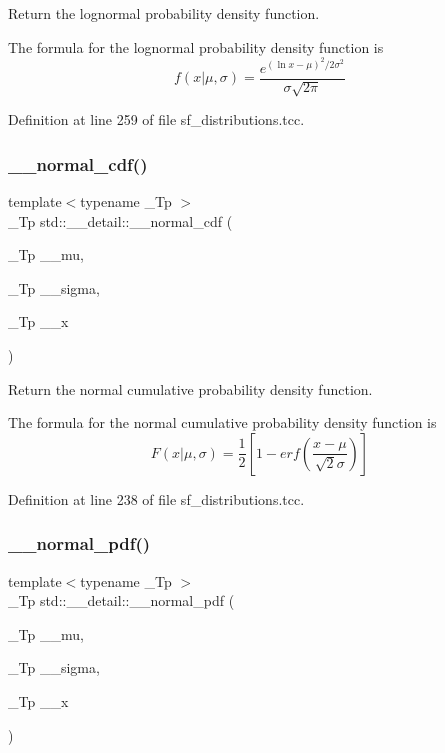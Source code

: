 Return the lognormal probability density function. 

The formula for the lognormal probability density function is \[ f(x|\mu,\sigma) = \frac{e^{(\ln{x}-\mu)^2/2\sigma^2}}{\sigma\sqrt{2\pi}} \] 

Definition at line 259 of file sf\+\_\+distributions.\+tcc.

\mbox{\label{namespacestd_1_1____detail_a718b0f0884f0bc91b038ef4dabbb7427}} 
\subsubsection{\texorpdfstring{\+\_\+\+\_\+normal\+\_\+cdf()}{\_\_normal\_cdf()}}
{\footnotesize\ttfamily template$<$typename \+\_\+\+Tp $>$ \\
\+\_\+\+Tp std\+::\+\_\+\+\_\+detail\+::\+\_\+\+\_\+normal\+\_\+cdf (\begin{DoxyParamCaption}\item[{\+\_\+\+Tp}]{\+\_\+\+\_\+mu,  }\item[{\+\_\+\+Tp}]{\+\_\+\+\_\+sigma,  }\item[{\+\_\+\+Tp}]{\+\_\+\+\_\+x }\end{DoxyParamCaption})}



Return the normal cumulative probability density function. 

The formula for the normal cumulative probability density function is \[ F(x|\mu,\sigma) = \frac{1}{2}\left[ 1-erf(\frac{x-\mu}{\sqrt{2}\sigma}) \right] \] 

Definition at line 238 of file sf\+\_\+distributions.\+tcc.

\mbox{\label{namespacestd_1_1____detail_a6211a0741c8e2dfb219fb52d072295f4}} 
\subsubsection{\texorpdfstring{\+\_\+\+\_\+normal\+\_\+pdf()}{\_\_normal\_pdf()}}
{\footnotesize\ttfamily template$<$typename \+\_\+\+Tp $>$ \\
\+\_\+\+Tp std\+::\+\_\+\+\_\+detail\+::\+\_\+\+\_\+normal\+\_\+pdf (\begin{DoxyParamCaption}\item[{\+\_\+\+Tp}]{\+\_\+\+\_\+mu,  }\item[{\+\_\+\+Tp}]{\+\_\+\+\_\+sigma,  }\item[{\+\_\+\+Tp}]{\+\_\+\+\_\+x }\end{DoxyParamCaption})}



